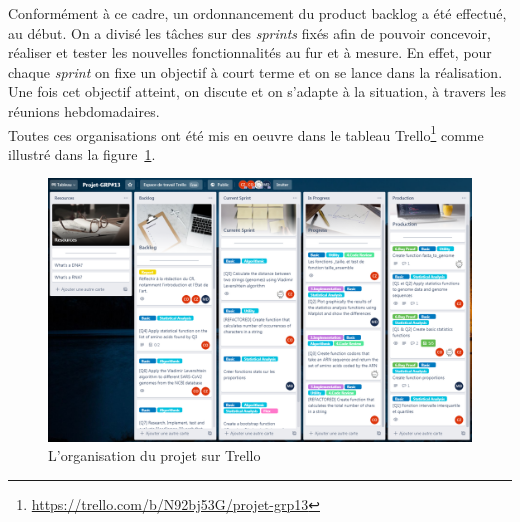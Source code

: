 \documentclass[12pt]{article}
\begin{document}
Conformément à ce cadre, un ordonnancement du product backlog a été effectué, au début. On a divisé les tâches sur des \textsl{sprints} fixés afin de pouvoir concevoir, réaliser et tester les nouvelles fonctionnalités au fur et à mesure.
En effet, pour chaque \textsl{sprint} on fixe un objectif à court terme et on se lance dans la réalisation. Une fois cet objectif atteint, on discute et on s'adapte à la situation, à travers les réunions hebdomadaires. \\
Toutes ces organisations ont été mis en oeuvre dans le tableau Trello\footnote{\url{https://trello.com/b/N92bj53G/projet-grp13}} comme illustré dans la figure~\ref{fig:Trellomid}.
    \begin{figure}[!h]
        \centering
        \includegraphics[scale = 0.5]{Images/Gestion de Projet/Trello/trello_milieu.PNG}
        \caption{L'organisation du projet sur Trello}
        \label{fig:Trellomid}
    \end{figure}
\end{document}
